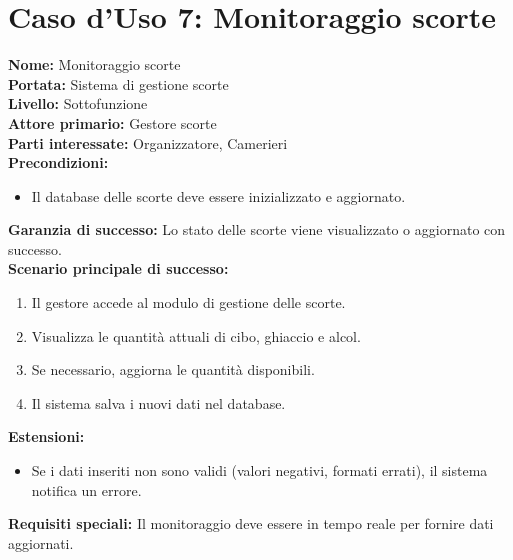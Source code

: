 \documentclass[a4paper,12pt]{article}
\begin{document}
\section*{\textcolor{sectioncolor}{Caso d'Uso 7: Monitoraggio scorte}}
\textcolor{textcolor}{
\textbf{Nome:} Monitoraggio scorte\\
\textbf{Portata:} Sistema di gestione scorte\\
\textbf{Livello:} Sottofunzione\\
\textbf{Attore primario:} Gestore scorte\\
\textbf{Parti interessate:} Organizzatore, Camerieri\\
\textbf{Precondizioni:}
\begin{itemize}
    \item Il database delle scorte deve essere inizializzato e aggiornato.
\end{itemize}
\textbf{Garanzia di successo:} Lo stato delle scorte viene visualizzato o aggiornato con successo.\\
\textbf{Scenario principale di successo:}
\begin{enumerate}
    \item Il gestore accede al modulo di gestione delle scorte.
    \item Visualizza le quantità attuali di cibo, ghiaccio e alcol.
    \item Se necessario, aggiorna le quantità disponibili.
    \item Il sistema salva i nuovi dati nel database.
\end{enumerate}
\textbf{Estensioni:}
\begin{itemize}
    \item  Se i dati inseriti non sono validi (valori negativi, formati errati), il sistema notifica un errore.
\end{itemize}
\textbf{Requisiti speciali:} Il monitoraggio deve essere in tempo reale per fornire dati aggiornati.
}
\end{document}
